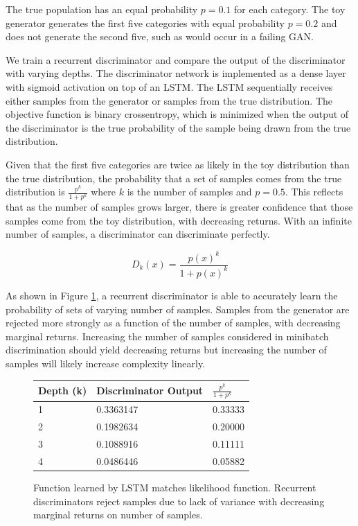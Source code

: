 \documentclass{article}
\begin{document}
The true population has an equal probability $p=0.1$ for each category. The toy generator generates the first five categories with equal probability $p=0.2$ and does not generate the second five, such as would occur in a failing GAN.

We train a recurrent discriminator and compare the output of the discriminator with varying depths. The discriminator network is implemented as a dense layer with sigmoid activation on top of an LSTM. The LSTM sequentially receives either samples from the generator or samples from the true distribution. The objective function is binary crossentropy, which is minimized when the output of the discriminator is the true probability of the sample being drawn from the true distribution.

Given that the first five categories are twice as likely in the toy distribution than the true distribution, the probability that a set of samples comes from the true distribution is $\frac{p^k}{1+p^k}$ where $k$ is the number of samples and $p=0.5$. This reflects that as the number of samples grows larger, there is greater confidence that those samples come from the toy distribution, with decreasing returns. With an infinite number of samples, a discriminator can discriminate perfectly.

$$ D_k(x) = \frac{p(x)^k}{1+p(x)^k}$$

As shown in Figure \ref{table:rd}, a recurrent discriminator is able to accurately learn the probability of sets of varying number of samples. Samples from the generator are rejected more strongly as a function of the number of samples, with decreasing marginal returns. Increasing the number of samples considered in minibatch discrimination should yield decreasing returns but increasing the number of samples will likely increase complexity linearly.

\begin{figure}[h]
\caption{Function learned by LSTM matches likelihood function. Recurrent discriminators reject samples due to lack of variance with decreasing marginal returns on number of samples.}
\label{table:rd}
\centering
\begin{tabular}{ l l l } 
 \hline  \hline
 Depth (k) & Discriminator Output & $\frac{p^k}{1+p^k}$ \\
 \hline
 1 & 0.3363147 & 0.33333 \\
 2 &  0.1982634 & 0.20000 \\
 3 &  0.1088916   & 0.11111 \\
 4 &  0.0486446 & 0.05882 \\  \hline  \hline
\end{tabular}
\end{figure}
\end{document}

